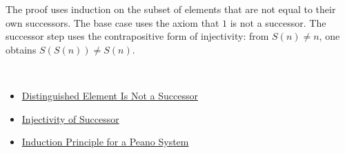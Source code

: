 \begin{remark*}
The proof uses induction on the subset of elements that are not equal to
their own successors. The base case uses the axiom that $1$ is not a
successor. The successor step uses the contrapositive form of injectivity:
from $S(n)\neq n$, one obtains $S(S(n))\neq S(n)$.
\end{remark*}

\begin{remark*}[Dependencies]~\\
\begin{itemize}
  \item \hyperref[ax:peano-one-not-successor]{Distinguished Element Is Not a Successor}
  \item \hyperref[ax:peano-successor-injective]{Injectivity of Successor}
  \item \hyperref[thm:induction-principle-for-peano-system]{Induction Principle for a Peano System}
\end{itemize}
\end{remark*}
